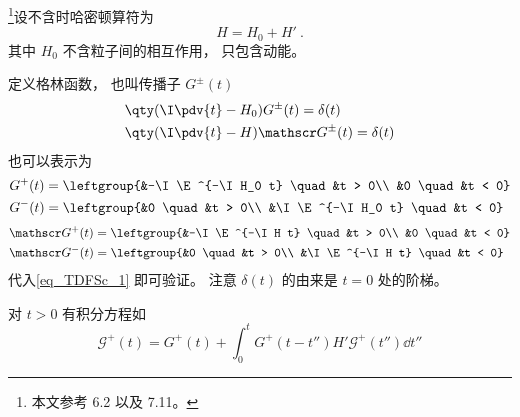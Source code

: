 
\footnote{本文参考 \cite{Newton} 6.2 以及 \cite{Sakurai} 7.11。}设不含时哈密顿算符为
\begin{equation}
H = H_0 + H'~.
\end{equation}
其中 $H_0$ 不含粒子间的相互作用， 只包含动能。

定义格林函数， 也叫传播子 $G^\pm(t)$
\begin{equation}\label{eq_TDFSc_1}
\begin{aligned}
&\qty(\I\pdv{t} - H_0)G^\pm (t) = \delta(t)\\
&\qty(\I\pdv{t} - H)\mathscr G^\pm (t) = \delta(t)
\end{aligned}
\end{equation}
也可以表示为
\begin{equation}
\begin{aligned}
&G^+(t) = \leftgroup{&-\I \E^{-\I H_0 t} \quad &t > 0\\
&0 \quad &t < 0}\\
&G^-(t) = \leftgroup{&0 \quad &t > 0\\
&\I \E^{-\I H_0 t} \quad &t < 0}
\end{aligned}
\end{equation}
\begin{equation}
\begin{aligned}
&\mathscr G^+(t) = \leftgroup{&-\I \E^{-\I H t} \quad &t > 0\\
&0 \quad &t < 0}\\
&\mathscr G^-(t) = \leftgroup{&0 \quad &t > 0\\
&\I \E^{-\I H t} \quad &t < 0}
\end{aligned}
\end{equation}
代入\autoref{eq_TDFSc_1} 即可验证。 注意 $\delta(t)$ 的由来是 $t=0$ 处的阶梯。

对 $t>0$ 有积分方程如
\begin{equation}
\mathscr G^+(t) = G^+(t) + \int_0^t G^+(t-t'')H'\mathscr G^+(t'')\dd{t''}
\end{equation}

